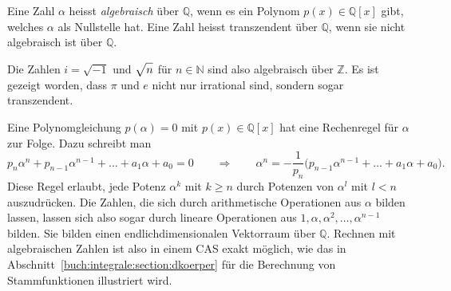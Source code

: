 \begin{definition}
Eine Zahl $\alpha$ heisst {\em algebraisch} über $\mathbb{Q}$,
wenn es ein Polynom
%
$p(x)\in \mathbb{Q}[x]$ gibt, welches $\alpha$ als Nullstelle hat.
Eine Zahl heisst transzendent über $\mathbb{Q}$, wenn sie nicht algebraisch ist
über $\mathbb{Q}$.
\end{definition}

Die Zahlen $i=\sqrt{-1}$ und $\sqrt{n\mathstrut}$ für $n\in\mathbb{N}$
sind also algebraisch über $\mathbb{Z}$.
Es ist gezeigt worden, dass $\pi$ und $e$ nicht nur irrational
sind, sondern sogar transzendent.

Eine Polynomgleichung $p(\alpha)=0$ mit $p(x)\in\mathbb{Q}[x]$
hat eine Rechenregel für $\alpha$ zur Folge.
Dazu schreibt man
\[
p_n\alpha^n + p_{n-1}\alpha^{n-1} + \dots + a_1\alpha + a_0 =0
\qquad\Rightarrow\qquad
\alpha^n = -\frac{1}{p_n}\bigl(
p_{n-1}\alpha^{n-1}+\dots+a_1\alpha+a_0
\bigr).
\]
Diese Regel erlaubt, jede Potenz $\alpha^k$ mit $k\ge n$ durch
Potenzen von $\alpha^l$ mit $l<n$ auszudrücken.
Die Zahlen, die sich durch arithmetische Operationen aus
$\alpha$ bilden lassen, lassen sich also sogar durch lineare
Operationen aus $1,\alpha,\alpha^2,\dots,\alpha^{n-1}$
bilden.
Sie bilden einen endlichdimensionalen Vektorraum über $\mathbb{Q}$.
Rechnen mit algebraischen Zahlen ist also in einem CAS exakt möglich,
wie das in Abschnitt~\ref{buch:integrale:section:dkoerper}
für die Berechnung von Stammfunktionen illustriert wird.


